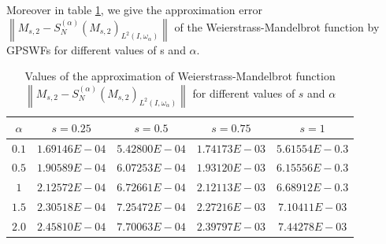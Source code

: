 \documentclass[]{article}
\newcommand{\norm}[1]{{\left\|{#1}\right\|}}
\begin{document}
Moreover in table \ref{table}, we give the approximation error $\norm{ M_{s,2}-S_N^{(\alpha)}(M_{s,2})_{L^2(I,\omega_{\alpha})} } $ of the Weierstrass-Mandelbrot function by GPSWFs for different values of s and $\alpha$.


\begin{table}
	
	\begin{center}
		
		
		
		\begin{tabular}[h!]{c c c c c}
			\hline
			$\alpha$ & $s=0.25 $ & $s=0.5$ & $s=0.75$ & $s=1 $  \\
			\hline
			$0.1$ & $1.69146E-04 $ & $5.42800E-04$ & $1.74173E-03$ & $ 5.61554E-0.3 $  \\
			$0.5$ & $1.90589E-04 $ & $6.07253E-04$ & $1.93120E-03$ & $ 6.15556E-0.3 $  \\
			$1$ & $2.12572E-04 $ & $6.72661E-04$ & $2.12113E-03$ & $ 6.68912E-0.3 $ \\
			$1.5$ & $2.30518E-04 $ & $7.25472E-04$ & $2.27216E-03$ & $7.10411E-03$  \\
			$2.0$ & $2.45810E-04$ & $7.70063E-04$ & $2.39797E-03$ & $7.44278E-03$  \\
			\hline
			
		\end{tabular}
	\end{center}
	\caption{Values of the approximation of Weierstrass-Mandelbrot function $ \norm{ M_{s,2}-S_N^{(\alpha)}(M_{s,2})_{L^2(I,\omega_{\alpha})} } $ for different values of $s$ and $\alpha$}
	\label{table}
	
\end{table}
\end{document}
